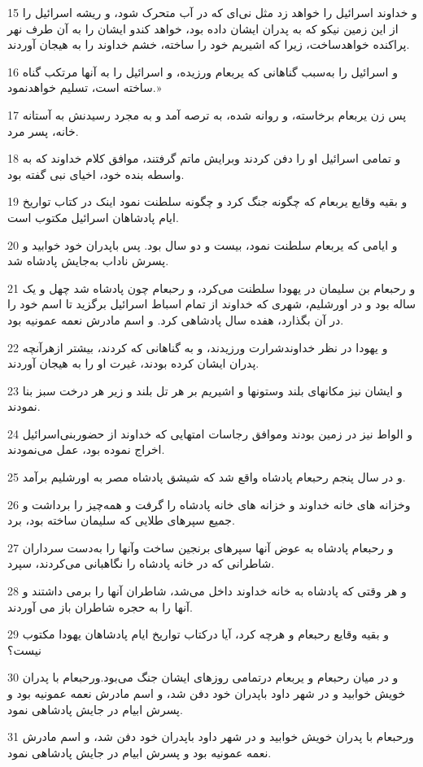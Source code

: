 \par 15 و خداوند اسرائیل را خواهد زد مثل نی‌ای که در آب متحرک شود، و ریشه اسرائیل را از این زمین نیکو که به پدران ایشان داده بود، خواهد کندو ایشان را به آن طرف نهر پراکنده خواهدساخت، زیرا که اشیریم خود را ساخته، خشم خداوند را به هیجان آوردند.
\par 16 و اسرائیل را به‌سبب گناهانی که یربعام ورزیده، و اسرائیل را به آنها مرتکب گناه ساخته است، تسلیم خواهدنمود.»
\par 17 پس زن یربعام برخاسته، و روانه شده، به ترصه آمد و به مجرد رسیدنش به آستانه خانه، پسر مرد.
\par 18 و تمامی اسرائیل او را دفن کردند وبرایش ماتم گرفتند، موافق کلام خداوند که به واسطه بنده خود، اخیای نبی گفته بود.
\par 19 و بقیه وقایع یربعام که چگونه جنگ کرد و چگونه سلطنت نمود اینک در کتاب تواریخ ایام پادشاهان اسرائیل مکتوب است.
\par 20 و ایامی که یربعام سلطنت نمود، بیست و دو سال بود. پس باپدران خود خوابید و پسرش ناداب به‌جایش پادشاه شد.
\par 21 و رحبعام بن سلیمان در یهودا سلطنت می‌کرد، و رحبعام چون پادشاه شد چهل و یک ساله بود و در اورشلیم، شهری که خداوند از تمام اسباط اسرائیل برگزید تا اسم خود را در آن بگذارد، هفده سال پادشاهی کرد. و اسم مادرش نعمه عمونیه بود.
\par 22 و یهودا در نظر خداوندشرارت ورزیدند، و به گناهانی که کردند، بیشتر ازهر‌آنچه پدران ایشان کرده بودند، غیرت او را به هیجان آوردند.
\par 23 و ایشان نیز مکانهای بلند وستونها و اشیریم بر هر تل بلند و زیر هر درخت سبز بنا نمودند.
\par 24 و الواط نیز در زمین بودند وموافق رجاسات امتهایی که خداوند از حضوربنی‌اسرائیل اخراج نموده بود، عمل می‌نمودند.
\par 25 و در سال پنجم رحبعام پادشاه واقع شد که شیشق پادشاه مصر به اورشلیم برآمد.
\par 26 وخزانه های خانه خداوند و خزانه های خانه پادشاه را گرفت و همه‌چیز را برداشت و جمیع سپرهای طلایی که سلیمان ساخته بود، برد.
\par 27 و رحبعام پادشاه به عوض آنها سپرهای برنجین ساخت وآنها را به‌دست سرداران شاطرانی که در خانه پادشاه را نگاهبانی می‌کردند، سپرد.
\par 28 و هر وقتی که پادشاه به خانه خداوند داخل می‌شد، شاطران آنها را برمی داشتند و آنها را به حجره شاطران باز می آوردند. 
\par 29 و بقیه وقایع رحبعام و هرچه کرد، آیا درکتاب تواریخ ایام پادشاهان یهودا مکتوب نیست؟
\par 30 و در میان رحبعام و یربعام درتمامی روزهای ایشان جنگ می‌بود.ورحبعام با پدران خویش خوابید و در شهر داود باپدران خود دفن شد، و اسم مادرش نعمه عمونیه بود و پسرش ابیام در جایش پادشاهی نمود.
\par 31 ورحبعام با پدران خویش خوابید و در شهر داود باپدران خود دفن شد، و اسم مادرش نعمه عمونیه بود و پسرش ابیام در جایش پادشاهی نمود.
 
